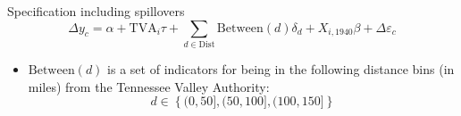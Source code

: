 \documentclass[aspectratio=43]{beamer}
\begin{document}
\begin{frame}{Specification including spillovers}
    \begin{equation}
        \Delta y_c = \alpha + \text{TVA}_i \tau + \sum_{d \in \text{Dist}} \text{Between}(d)\delta_d + X_{i, 1940} \beta + \Delta \varepsilon_c
    \end{equation} 

    \begin{itemize}
        \item $\text{Between}(d)$ is a set of indicators for being in the following distance bins (in miles) from the Tennessee Valley Authority: 
        \[ d \in \left\{ (0, 50], (50, 100], (100, 150] \right\} \]
    \end{itemize}
\end{frame}

\end{document}
